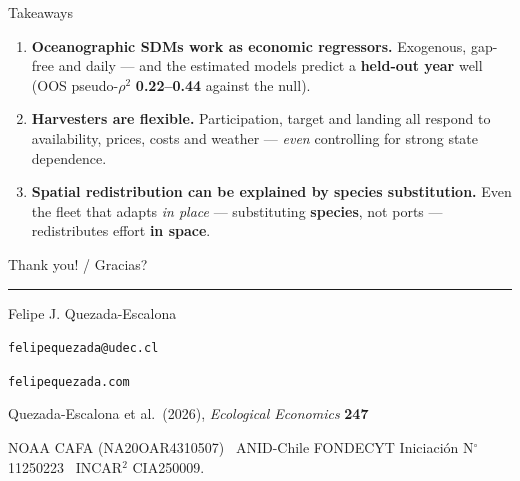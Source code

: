 \documentclass[aspectratio=169,11pt]{beamer}
\begin{document}
\begin{frame}{Takeaways}
\begin{enumerate}
  \item \textbf{Oceanographic SDMs work as economic regressors.} Exogenous, gap-free
        and daily --- and the estimated models predict a \textbf{held-out year} well
        (OOS pseudo-$\rho^2$ \textbf{0.22--0.44} against the null).
  \item \textbf{Harvesters are flexible.} Participation, target and landing all respond to
        availability, prices, costs and weather --- \emph{even} controlling for strong
        state dependence.
  \item \textbf{Spatial redistribution can be explained by species substitution.} Even the fleet that adapts
        \emph{in place} --- substituting \textbf{species}, not ports --- redistributes effort
        \textbf{in space}.
\end{enumerate}
\end{frame}

{%
\begin{frame}[plain]
\centering
\vspace*{3mm}
\inserttitlegraphic\par
\vskip5mm
{\color{udecgold} Thank you! / \textquestiondown Gracias?\par}
\vskip2mm
{\color{white!45}\rule{0.30\textwidth}{0.6pt}}\par
\vskip5mm
{\color{white}Felipe J. Quezada-Escalona\par}
\vskip3mm
{\small\color{white!80}\texttt{felipequezada@udec.cl}\par}
\vskip1.5mm
{\small\color{white!80}\texttt{felipequezada.com}\par}
\vskip5mm
{\footnotesize\color{white!55}Quezada-Escalona et al.\ (2026),
\emph{Ecological Economics} \textbf{247}\par}
\vfill
{\tiny\color{white!45} NOAA CAFA (NA20OAR4310507) \textbullet\ ANID-Chile FONDECYT
Iniciaci\'on N$^{\circ}$ 11250223 \textbullet\ INCAR$^2$ CIA250009.\par}
\vspace*{3mm}
\end{frame}
}
\end{document}
